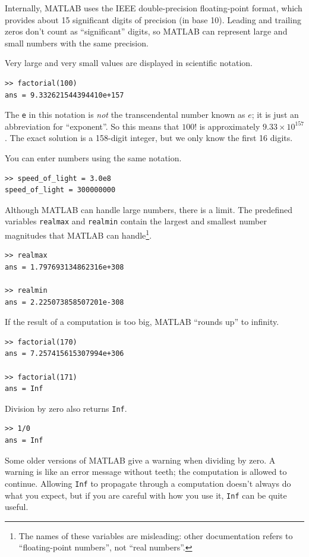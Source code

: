 \documentclass{book}
\begin{document}
Internally, MATLAB uses the IEEE double-precision floating-point
format, which provides about 15 significant digits of precision (in
base 10).  Leading and trailing zeros don't count as ``significant''
digits, so MATLAB can represent large and small numbers
with the same precision.

Very large and very small values are displayed in scientific notation.

\begin{verbatim}
>> factorial(100)
ans = 9.332621544394410e+157
\end{verbatim}

The {\tt e} in this notation is {\em not} the transcendental number
known as $e$; it is just an abbreviation for ``exponent''.  So
this means that $100!$ is approximately $9.33 \times 10^{157}$.  The
exact solution is a 158-digit integer, but we only know the first 16
digits.

You can enter numbers using the same notation.

\begin{verbatim}
>> speed_of_light = 3.0e8
speed_of_light = 300000000
\end{verbatim}

Although MATLAB can handle large numbers, there is a limit.  The
predefined variables {\tt realmax} and {\tt realmin} contain the
largest and smallest number magnitudes that MATLAB can handle\footnote{The names
of these variables are misleading: other documentation refers to ``floating-point numbers'', not ``real numbers''.}.

\begin{verbatim}
>> realmax
ans = 1.797693134862316e+308

>> realmin
ans = 2.225073858507201e-308
\end{verbatim}

If the result of a computation is too big, MATLAB ``rounds up''
to infinity.

\begin{verbatim}
>> factorial(170)
ans = 7.257415615307994e+306

>> factorial(171)
ans = Inf
\end{verbatim}

Division by zero also returns {\tt Inf}. 

\begin{verbatim}
>> 1/0
ans = Inf
\end{verbatim}

Some older versions of MATLAB give a warning when dividing by zero. 
A warning is like an error message without teeth; the computation
is allowed to continue.  Allowing {\tt Inf} to propagate
through a computation doesn't always do what you expect, but if you
are careful with how you use it, {\tt Inf} can be quite useful.
\end{document}
